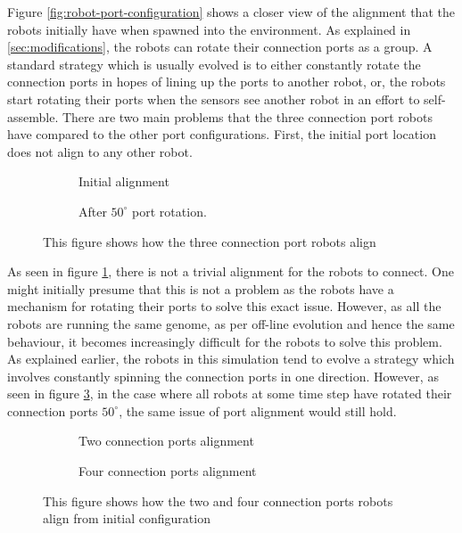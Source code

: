 Figure \ref{fig:robot-port-configuration} shows a closer view of the alignment that the robots initially have when spawned into the environment.
As explained in \ref{sec:modifications}, the robots can rotate their connection ports as a group.
A standard strategy which is usually evolved is to either constantly rotate the connection ports in hopes of lining up the ports to another robot, or, the robots start rotating their ports when the sensors see another robot in an effort to self-assemble.
There are two main problems that the three connection port robots have compared to the other port configurations.
First, the initial port location does not align to any other robot.


\begin{figure}[H]
	\begin{subfigure}[t]{0.49\textwidth}
		\centering
		\caption{Initial alignment}
		\label{3-port-guided-allignment}
	\end{subfigure}
	\begin{subfigure}[t]{0.49\textwidth}
		\centering
		\caption{After $50^{\circ}$ port rotation.}
		\label{3-port-guided-allignment-offset}
	\end{subfigure}
	\caption{This figure shows how the three connection port robots align}
\end{figure}


As seen in figure \ref{3-port-guided-allignment}, there is not a trivial alignment for the robots to connect.
One might initially presume that this is not a problem as the robots have a mechanism for rotating their ports to solve this exact issue.
However, as all the robots are running the same genome, as per off-line evolution and hence the same behaviour, it becomes increasingly difficult for the robots to solve this problem.
As explained earlier, the robots in this simulation tend to evolve a strategy which involves constantly spinning the connection ports in one direction.
However, as seen in figure \ref{3-port-guided-allignment-offset}, in the case where all robots at some time step have rotated their connection ports $50^{\circ}$, the same issue of port alignment would still hold.

\begin{figure}[H]
	\begin{subfigure}[t]{0.49\textwidth}
		\centering
		\caption{Two connection ports alignment}
		\label{2-port-guided-allignment}
	\end{subfigure}
	\begin{subfigure}[t]{0.49\textwidth}
		\centering
		\caption{Four connection ports alignment}
		\label{4-port-guided-allignment}
	\end{subfigure}
	\caption{This figure shows how the two and four connection ports robots align from initial configuration}
	\label{2-4-port-guided-allignment}
\end{figure}

